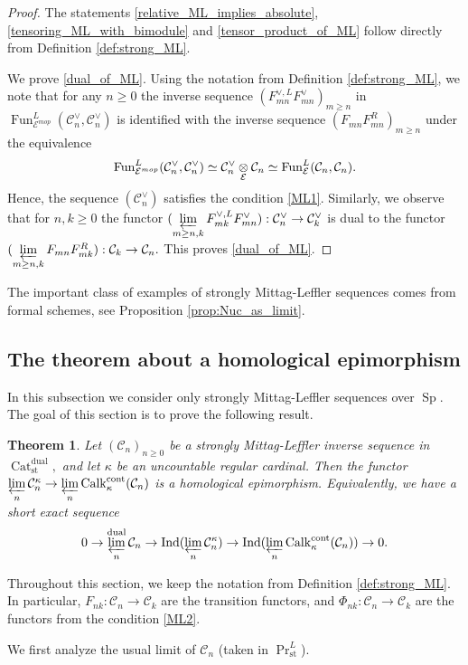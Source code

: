 \documentclass[11pt,leqno]{amsart}
\newtheorem{theo}{Theorem}[section]
\numberwithin{equation}{section}
\newcommand{\tens}[1]{%
  \mathbin{\mathop{\otimes}\displaylimits_{#1}}%
}
\newcommand{\prolim}[1][]{\mathop{\varprojlim}\limits_{#1}}
\newcommand{\Cat}{\operatorname{Cat}}
\newcommand{\cont}{\operatorname{cont}}
\newcommand{\st}{\operatorname{st}}
\newcommand{\dual}{\operatorname{dual}}
\newcommand{\cC}{{\mathcal C}}
\newcommand{\cE}{{\mathcal E}}
\newcommand{\Fun}{\operatorname{Fun}}
\newcommand{\Sp}{\operatorname{Sp}}
\newcommand{\Ind}{\operatorname{Ind}}
\newcommand{\Calk}{\operatorname{Calk}}
\begin{document}
\begin{proof}
The statements \ref{relative_ML_implies_absolute}, \ref{tensoring_ML_with_bimodule} and \ref{tensor_product_of_ML} follow directly from Definition \ref{def:strong_ML}.

We prove \ref{dual_of_ML}.  Using the notation from Definition \ref{def:strong_ML}, we note that for any $n\geq 0$ the inverse sequence $(F_{mn}^{\vee,L}F_{mn}^{\vee})_{m\geq n}$ in $\Fun_{\cE^{mop}}^L(\cC_n^{\vee},\cC_n^{\vee})$ is identified with the inverse sequence $(F_{mn}F_{mn}^R)_{m\geq n}$ under the equivalence
$$\Fun_{\cE^{mop}}^L(\cC_n^{\vee},\cC_n^{\vee})\simeq \cC_n^{\vee}\tens{\cE}\cC_n\simeq \Fun^L_{\cE}(\cC_n,\cC_n).$$ Hence, the sequence $(\cC_n^{\vee})$ satisfies the condition \ref{ML1}. Similarly, we observe that for $n,k\geq 0$ the functor $(\prolim[m\geq n,k]F_{mk}^{\vee,L}F_{mn}^{\vee}):\cC_n^{\vee}\to\cC_k^{\vee}$ is dual to the functor $(\prolim[m\geq n,k]F_{mn}F_{mk}^R):\cC_k\to\cC_n.$ This proves \ref{dual_of_ML}.
\end{proof}

The important class of examples of strongly Mittag-Leffler sequences comes from formal schemes, see Proposition \ref{prop:Nuc_as_limit}.

\subsection{The theorem about a homological epimorphism}

In this subsection we consider only strongly Mittag-Leffler sequences over $\Sp.$ The goal of this section is to prove the following result.

\begin{theo}\label{th:hom_epi_for_ML}
	Let $(\cC_n)_{n\geq 0}$ be a strongly Mittag-Leffler inverse sequence in $\Cat_{\st}^{\dual},$ and let $\kappa$ be an uncountable regular cardinal. Then the functor $\prolim[n]\cC_n^{\kappa}\to \prolim[n]\Calk^{\cont}_{\kappa}(\cC_n)$ is a homological epimorphism. Equivalently, we have a short exact sequence
	$$0\to \prolim[n]^{\dual}\cC_n\to\Ind(\prolim[n]\cC_n^{\kappa})\to\Ind(\prolim[n]\Calk^{\cont}_{\kappa}(\cC_n))\to 0.$$
\end{theo}

Throughout this section, we keep the notation from Definition \ref{def:strong_ML}. In particular, $F_{nk}:\cC_n\to\cC_k$ are the transition functors, and $\Phi_{nk}:\cC_n\to\cC_k$ are the functors from the condition \ref{ML2}.

We first analyze the usual limit of $\cC_n$ (taken in $\Pr^L_{\st}$).
\end{document}
